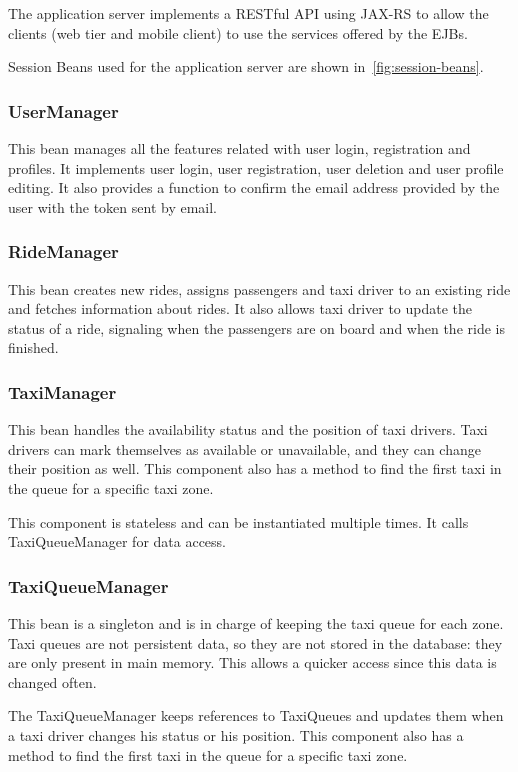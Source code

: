 The application server implements a RESTful API using JAX-RS to allow the clients (web tier and mobile client) to use the services offered by the EJBs.

Session Beans used for the application server are shown in~\autoref{fig:session-beans}.

\subsubsection{UserManager}
This bean manages all the features related with user login, registration and profiles.
It implements user login, user registration, user deletion and user profile editing.
It also provides a function to confirm the email address provided by the user with the token sent by email.

\subsubsection{RideManager}
This bean creates new rides, assigns passengers and taxi driver to an existing ride and fetches information about rides.
It also allows taxi driver to update the status of a ride, signaling when the passengers are on board and when the ride is finished.

\subsubsection{TaxiManager}
This bean handles the availability status and the position of taxi drivers.
Taxi drivers can mark themselves as available or unavailable, and they can change their position as well.
This component also has a method to find the first taxi in the queue for a specific taxi zone.

This component is stateless and can be instantiated multiple times. It calls TaxiQueueManager for data access.

\subsubsection{TaxiQueueManager}
This bean is a singleton and is in charge of keeping the taxi queue for each zone.
Taxi queues are not persistent data, so they are not stored in the database: they are only present in main memory.
This allows a quicker access since this data is changed often.

The TaxiQueueManager keeps references to TaxiQueues and updates them when a taxi driver changes his status or his position.
This component also has a method to find the first taxi in the queue for a specific taxi zone.

